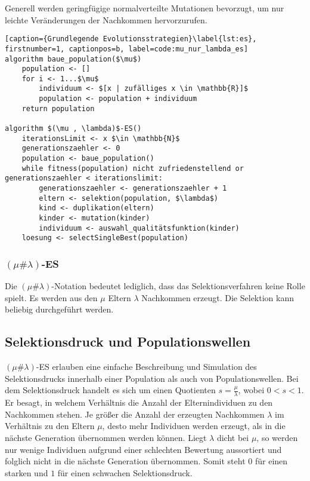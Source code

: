 Generell werden geringfügige normalverteilte Mutationen bevorzugt, um nur leichte Veränderungen der Nachkommen hervorzurufen.

\begin{lstlisting}[caption={Grundlegende Evolutionsstrategien}\label{lst:es}, firstnumber=1, captionpos=b, label=code:mu_nur_lambda_es]
algorithm baue_population($\mu$)
	population <- []
	for i <- 1...$\mu$
		individuum <- $[x | zufälliges x \in \mathbb{R}]$
		population <- population + individuum
	return population

algorithm $(\mu , \lambda)$-ES()
	iterationsLimit <- x $\in \mathbb{N}$
	generationszaehler <- 0
	population <- baue_population()
	while fitness(population) nicht zufriedenstellend or generationszaehler < iterationslimit:
		generationszaehler <- generationszaehler + 1
		eltern <- selektion(population, $\lambda$)
		kind <- duplikation(eltern)
		kinder <- mutation(kinder)
		individuum <- auswahl_qualitätsfunktion(kinder)
	loesung <- selectSingleBest(population)
\end{lstlisting}


\subsubsection{$(\mu \# \lambda)$-ES}

Die $(\mu \# \lambda)$-Notation bedeutet lediglich, dass das Selektionsverfahren keine Rolle spielt.
Es werden aus den $\mu$ Eltern $\lambda$ Nachkommen erzeugt. Die Selektion kann beliebig durchgeführt werden.

\subsection{Selektionsdruck und Populationswellen}

$(\mu \# \lambda)$-ES erlauben eine einfache Beschreibung und Simulation des Selektionsdrucks innerhalb einer Population als auch von Populationswellen.
Bei dem Selektionsdruck handelt es sich um einen Quotienten $s = \frac{\mu}{\lambda}$, wobei $0 < s < 1$.
Er besagt, in welchem Verhältnis die Anzahl der Elternindividuen zu den Nachkommen stehen.
Je größer die Anzahl der erzeugten Nachkommen $\lambda$ im Verhältnis zu den Eltern $\mu$, desto mehr Individuen werden erzeugt, als in die nächste Generation übernommen werden können.
Liegt $\lambda$ dicht bei $\mu$, so werden nur wenige Individuen aufgrund einer schlechten Bewertung aussortiert und folglich nicht in die nächste Generation übernommen.
Somit steht $0$ für einen starken und $1$ für einen schwachen Selektionsdruck.

